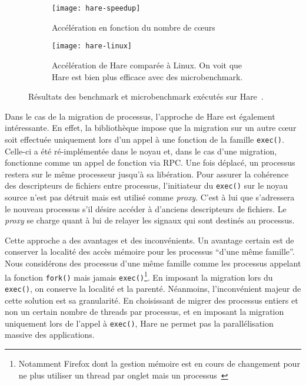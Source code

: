       \begin{figure}[ht]
        \begin{subfigure}[b]{0.5\textwidth}
          \texttt{[image: hare-speedup]}
          \caption{Accélération en fonction du nombre de c\oe urs}
        \end{subfigure}
        \begin{subfigure}[b]{0.5\textwidth}
          \texttt{[image: hare-linux]}
          \caption{Accélération de Hare comparée à Linux. On voit que Hare est
            bien plus efficace avec des microbenchmark.}
        \end{subfigure}
        \caption{Résultats des benchmark et microbenchmark exécutés sur
          Hare~\citep{gruenwald2014providing}.}
        \label{fig:hare-res}
      \end{figure}

      Dans le cas de la migration de processus, l'approche de Hare est également
      intéressante. En effet, la bibliothèque impose que la migration sur un
      autre c\oe ur soit effectuée uniquement lors d'un appel à une fonction de
      la famille \texttt{exec()}. Celle-ci a été ré-implémentée dans le noyau
      et, dans le cas d'une migration, fonctionne comme un appel de fonction via
      RPC. Une fois déplacé, un processus restera sur le même processeur jusqu'à
      sa libération. Pour assurer la cohérence des descripteurs de fichiers
      entre processus, l'initiateur du \texttt{exec()} sur le noyau source n'est
      pas détruit mais est utilisé comme \textit{proxy}. C'est à lui que
      s'adressera le nouveau processus s'il désire accéder à d'anciens
      descripteurs de fichiers. Le \textit{proxy} se charge quant à lui de
      relayer les signaux qui sont destinés au processus.

      \enlargethispage{2mm} %

      Cette approche a des avantages et des inconvénients. Un avantage certain
      est de conserver la localité des accès mémoire pour les processus ``d'une
      même famille''. Nous considérons des processus d'une même famille comme
      les processus appelant la fonction \texttt{fork()} mais jamais
      \texttt{exec()}\footnote{Notamment Firefox dont la gestion mémoire est en
        cours de changement pour ne plus utiliser un thread par onglet mais un
        processus~\citep{mozillaElectrolysis}}. En imposant la migration lors du
      \texttt{exec()}, on conserve la localité et la parenté. Néanmoins,
      l'inconvénient majeur de cette solution est sa granularité. En choisissant
      de migrer des processus entiers et non un certain nombre de threads par
      processus, et en imposant la migration uniquement lors de l'appel à
      \texttt{exec()}, Hare ne permet pas la parallélisation massive des
      applications.

